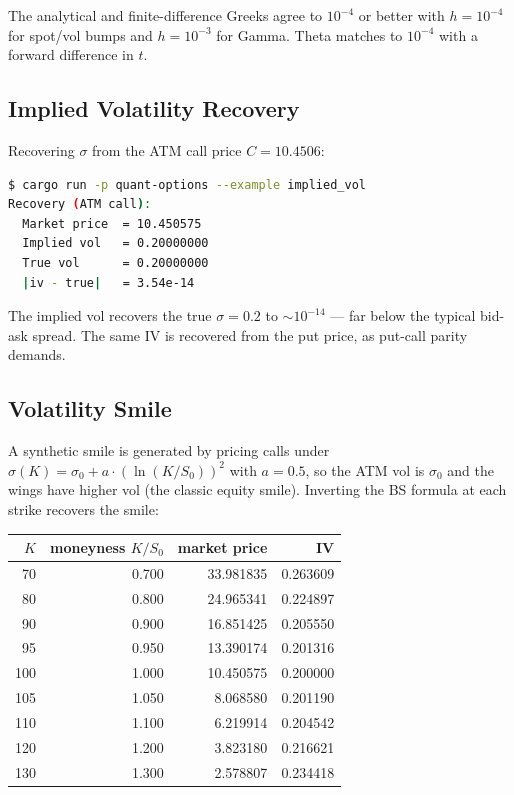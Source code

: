 The analytical and finite-difference Greeks agree to $10^{-4}$ or better
with $h = 10^{-4}$ for spot/vol bumps and $h = 10^{-3}$ for Gamma. Theta
matches to $10^{-4}$ with a forward difference in $t$.

\subsection{Implied Volatility Recovery}

Recovering $\sigma$ from the ATM call price $C = 10.4506$:

\begin{lstlisting}[language=bash]
$ cargo run -p quant-options --example implied_vol
Recovery (ATM call):
  Market price  = 10.450575
  Implied vol   = 0.20000000
  True vol      = 0.20000000
  |iv - true|   = 3.54e-14
\end{lstlisting}

The implied vol recovers the true $\sigma = 0.2$ to $\sim 10^{-14}$ ---
far below the typical bid-ask spread. The same IV is recovered from the
put price, as put-call parity demands.

\subsection{Volatility Smile}

A synthetic smile is generated by pricing calls under
$\sigma(K) = \sigma_0 + a \cdot (\ln(K/S_0))^2$ with $a = 0.5$, so the
ATM vol is $\sigma_0$ and the wings have higher vol (the classic equity
smile). Inverting the BS formula at each strike recovers the smile:

\begin{center}
\begin{tabular}{rrrr}
\toprule
$K$ & moneyness $K/S_0$ & market price & IV \\
\midrule
 70 & 0.700 & 33.981835 & 0.263609 \\
 80 & 0.800 & 24.965341 & 0.224897 \\
 90 & 0.900 & 16.851425 & 0.205550 \\
 95 & 0.950 & 13.390174 & 0.201316 \\
100 & 1.000 & 10.450575 & 0.200000 \\
105 & 1.050 &  8.068580 & 0.201190 \\
110 & 1.100 &  6.219914 & 0.204542 \\
120 & 1.200 &  3.823180 & 0.216621 \\
130 & 1.300 &  2.578807 & 0.234418 \\
\bottomrule
\end{tabular}
\end{center}

